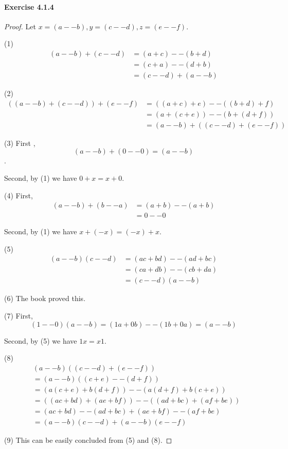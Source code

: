 \paragraph{Exercise 4.1.4} \label{exercise4.1.4}
\begin{proof}
Let $x=(a--b),y=(c--d),z=(e--f)$.

(1)
\begin{align*}
(a--b) + (c--d) 
&= (a+c) -- (b+d) \\
&= (c+a) -- (d+b) \\
&= (c--d) + (a--b)
\end{align*}

(2)
\begin{align*}
((a--b) + (c--d)) + (e--f)
&= ((a+c)+e) -- ((b+d)+f) \\
&= (a+(c+e)) -- (b+(d+f)) \\
&= (a--b) + ((c--d) + (e--f))
\end{align*}

(3)
First ,
\[
(a--b) + (0--0) = (a--b)
\].

Second, by (1) we have $0+x=x+0$.

(4)
First, 
\begin{align*}
(a--b) + (b--a) 
&= (a+b) -- (a+b) \\
&= 0 -- 0 \tag{$a+b+0=a+b+0$}
\end{align*}

Second, by (1) we have $x+(-x) = (-x) + x$.

(5)
\begin{align*}
(a--b)(c--d)
&= (ac + bd) -- (ad + bc) \\
&= (ca + db) -- (cb + da) \\
&= (c--d)(a--b)
\end{align*}

(6)
The book proved this.

(7)
First,
\[
(1--0)(a--b) = (1a + 0b) -- (1b+0a) = (a--b)
\]

Second, by (5) we have $1x=x1$.

(8)
\begin{align*}
&(a--b)((c--d)+(e--f)) \\
&= (a--b)((c+e)--(d+f)) \\
&= (a(c+e) + b(d+f)) -- (a(d+f) + b(c+e)) \\
&= ((ac + bd)+(ae + bf)) -- ((ad + bc)+(af + be)) \\
&= (ac+bd)--(ad+bc) + (ae+bf)--(af+be) \\
&= (a--b)(c--d) + (a--b)(e--f)
\end{align*}

(9)
This can be easily concluded from (5) and (8).
\end{proof}

